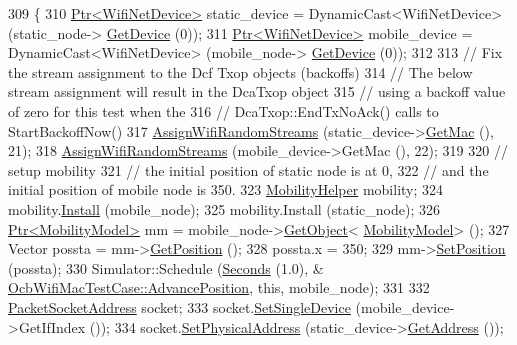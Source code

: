 \begin{DoxyCode}
309 \{
310   \hyperlink{classns3_1_1Ptr}{Ptr<WifiNetDevice>} static\_device = DynamicCast<WifiNetDevice> (static\_node->
      \hyperlink{classns3_1_1Node_a5918dfd24ef632efc9a83a5f6561c76e}{GetDevice} (0));
311   \hyperlink{classns3_1_1Ptr}{Ptr<WifiNetDevice>} mobile\_device = DynamicCast<WifiNetDevice> (mobile\_node->
      \hyperlink{classns3_1_1Node_a5918dfd24ef632efc9a83a5f6561c76e}{GetDevice} (0));
312 
313   \textcolor{comment}{// Fix the stream assignment to the Dcf Txop objects (backoffs)}
314   \textcolor{comment}{// The below stream assignment will result in the DcaTxop object}
315   \textcolor{comment}{// using a backoff value of zero for this test when the}
316   \textcolor{comment}{// DcaTxop::EndTxNoAck() calls to StartBackoffNow()}
317   \hyperlink{ocb-test-suite_8cc_a27e1dfc9840ff9d220527fa04cbd65de}{AssignWifiRandomStreams} (static\_device->\hyperlink{classns3_1_1WifiNetDevice_a48a0f63009cc101fd7d8338a7b3dc482}{GetMac} (), 21);
318   \hyperlink{ocb-test-suite_8cc_a27e1dfc9840ff9d220527fa04cbd65de}{AssignWifiRandomStreams} (mobile\_device->GetMac (), 22);
319 
320   \textcolor{comment}{// setup mobility}
321   \textcolor{comment}{// the initial position of static node is at 0,}
322   \textcolor{comment}{// and the initial position of mobile node is 350.}
323   \hyperlink{classns3_1_1MobilityHelper}{MobilityHelper} mobility;
324   mobility.\hyperlink{classns3_1_1MobilityHelper_a07737960ee95c0777109cf2994dd97ae}{Install} (mobile\_node);
325   mobility.Install (static\_node);
326   \hyperlink{classns3_1_1Ptr}{Ptr<MobilityModel>} mm = mobile\_node->\hyperlink{classns3_1_1Object_a13e18c00017096c8381eb651d5bd0783}{GetObject}<
      \hyperlink{classns3_1_1MobilityModel}{MobilityModel}> ();
327   Vector possta = mm->\hyperlink{classns3_1_1MobilityModel_aba838f06ec5bbb2d193d94b8c0e4abb4}{GetPosition} ();
328   possta.x = 350;
329   mm->\hyperlink{classns3_1_1MobilityModel_ac584b3d5a309709d2f13ed6ada1e7640}{SetPosition} (possta);
330   Simulator::Schedule (\hyperlink{group__timecivil_ga33c34b816f8ff6628e33d5c8e9713b9e}{Seconds} (1.0), &
      \hyperlink{classOcbWifiMacTestCase_ad5e48fa54162b72df8c5e1c9701840e6}{OcbWifiMacTestCase::AdvancePosition}, \textcolor{keyword}{this}, mobile\_node);
331 
332   \hyperlink{classns3_1_1PacketSocketAddress}{PacketSocketAddress} socket;
333   socket.\hyperlink{classns3_1_1PacketSocketAddress_ad1caa016f4d27c9d5f2c06dbfc53f8a3}{SetSingleDevice} (mobile\_device->GetIfIndex ());
334   socket.\hyperlink{classns3_1_1PacketSocketAddress_a9452f9410a97e57344e464e25c2ab0f3}{SetPhysicalAddress} (static\_device->\hyperlink{classns3_1_1WifiNetDevice_a77fc34ff26c7af715b8ad1050aeb90ea}{GetAddress} ());

\end{DoxyCode}
